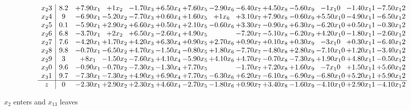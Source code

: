 \documentclass[12pt]{article}
\begin{document}
{\[\begin{array}{c| c c@{\hskip 2pt} c@{\hskip 2pt} c@{\hskip 2pt} c@{\hskip 2pt} c@{\hskip 2pt} c@{\hskip 2pt} c@{\hskip 2pt} c@{\hskip 2pt} c@{\hskip 2pt} c@{\hskip 2pt} c@{\hskip 2pt} c@{\hskip 2pt} }
 x_23   &  8.2 & + 7.9  0 x_1 & + 1 x_2 & -1.7  0 x_3 & + 6.5  0 x_4 & + 7.6  0 x_5 & -2.9  0 x_6 & -6.4  0 x_7 & + 4.5  0 x_8 & -5.6  0 x_9 & -1 x_10 & -1.4  0 x_11 & -7.5  0 x_12\\
 x_24   &  9 & -6.9  0 x_1 & -5.2  0 x_2 & -7.7  0 x_3 & + 0.6  0 x_4 & + 1.6  0 x_5 & + 1 x_6 & + 3.1  0 x_7 & + 7.9  0 x_8 & -0.6  0 x_9 & + 5.5  0 x_10 & -4.9  0 x_11 & -6.5  0 x_12\\
 x_25   &  0.1 & -5.9  0 x_1 & + 2.9  0 x_2 & + 6.6  0 x_3 & + 0.5  0 x_4 & + 2.1  0 x_5 & -0.6  0 x_6 & + 3.3  0 x_7 & -0.9  0 x_8 & + 6.3  0 x_9 & -6.2  0 x_10 & + 0.5  0 x_11 & -0.3  0 x_12\\
 x_26   &  6.8 & -3.7  0 x_1 & + 2 x_2 & + 6.5  0 x_3 & -2.6  0 x_4 & + 4.9  0 x_5 &   & -7.2  0 x_7 & -5.1  0 x_8 & -6.2  0 x_9 & + 4.2  0 x_10 & -1.8  0 x_11 & -2.6  0 x_12\\
 x_27   &  7.6 & -4.2  0 x_1 & + 1.7  0 x_2 & + 4.2  0 x_3 & + 6.3  0 x_4 & + 0.9  0 x_5 & + 2.7  0 x_6 & + 0.9  0 x_7 & + 0.1  0 x_8 & + 0.3  0 x_9 & -3 x_10 & + 0.3  0 x_11 & -6.4  0 x_12\\
 x_28   &  9.8 & -0.7  0 x_1 & -6.5  0 x_2 & + 4.7  0 x_3 & -1.5  0 x_4 & -0.8  0 x_5 & + 1.8  0 x_6 & -7.7  0 x_7 & -4.8  0 x_8 & + 2.8  0 x_9 & -7.1  0 x_10 & + 1.2  0 x_11 & -3.4  0 x_12\\
 x_29   &  3 & + 8 x_1 & -1.5  0 x_2 & -7.6  0 x_3 & + 4.1  0 x_4 & -5.9  0 x_5 & + 4.1  0 x_6 & + 4.7  0 x_7 & -0.7  0 x_8 & -7.3  0 x_9 & + 1.9  0 x_10 & + 4.8  0 x_11 & -0.5  0 x_12\\
 x_30   &  9.6 & -0.9  0 x_1 & -0.7  0 x_2 & -7.3  0 x_3 & -1.3  0 x_4 & + 7.7  0 x_5 &   & -1.7  0 x_7 & + 7.2  0 x_8 & + 1.6  0 x_9 & -7 x_10 & + 1.5  0 x_11 & + 5.6  0 x_12\\
 x_31   &  9.7 & -7.3  0 x_1 & -7.3  0 x_2 & + 4.9  0 x_3 & + 6.9  0 x_4 & + 7.7  0 x_5 & -6.3  0 x_6 & + 6.2  0 x_7 & -6.1  0 x_8 & -6.9  0 x_9 & -6.8  0 x_10 & + 5.2  0 x_11 & + 5.9  0 x_12\\
\hline
z    &  0 & -2.3  0 x_1 & + 2.9  0 x_2 & + 2.3  0 x_3 & + 4.6  0 x_4 & -2.7  0 x_5 & -1.8  0 x_6 & + 0.9  0 x_7 & + 3.4  0 x_8 & -1.6  0 x_9 & -4.1  0 x_10 & + 2.9  0 x_11 & -4.1  0 x_12\\
\end{array}\]


 $ x_2 $ enters and $ x_13 $ leaves 

}
\end{document}
